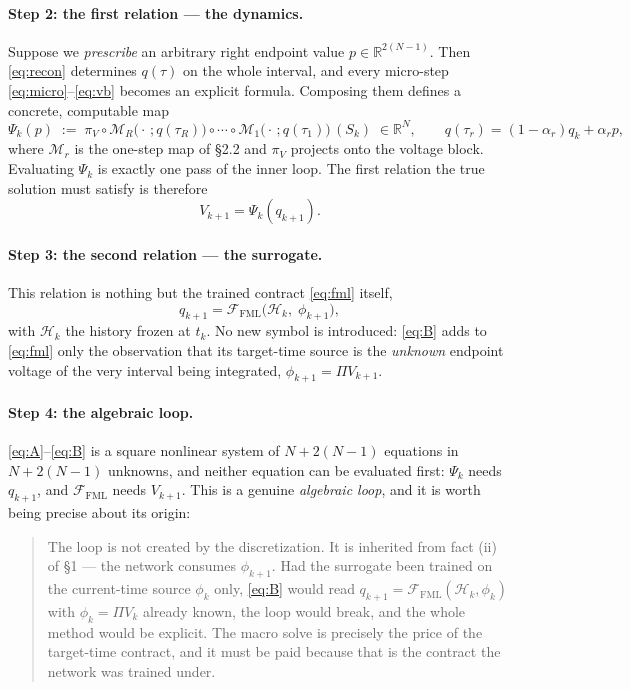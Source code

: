 \documentclass[11pt]{article}
\newcommand{\FML}{\mathcal{F}_{\mathrm{FML}}}
\newcommand{\Rn}{\mathbb{R}}
\begin{document}
\paragraph{Step 2: the first relation --- the dynamics.}
Suppose we \emph{prescribe} an arbitrary right endpoint value
$p\in\Rn^{2(N-1)}$. Then \eqref{eq:recon} determines $q(\tau)$ on the whole
interval, and every micro-step \eqref{eq:micro}--\eqref{eq:vb} becomes an
explicit formula. Composing them defines a concrete, computable map
\begin{equation}
\Psi_k(p)\;:=\;\pi_V\circ\mathcal M_R\bigl(\cdot\,;q(\tau_R)\bigr)\circ\cdots\circ
\mathcal M_1\bigl(\cdot\,;q(\tau_1)\bigr)\,(S_k)\;\in\Rn^N,
\qquad q(\tau_r)=(1-\alpha_r)q_k+\alpha_r p,
\label{eq:psi}
\end{equation}
where $\mathcal M_r$ is the one-step map of \S2.2 and $\pi_V$ projects onto the
voltage block. Evaluating $\Psi_k$ is exactly one pass of the inner loop. The
first relation the true solution must satisfy is therefore
\begin{equation}
V_{k+1}=\Psi_k(q_{k+1}).
\tag{A}
\label{eq:A}
\end{equation}

\paragraph{Step 3: the second relation --- the surrogate.}
This relation is nothing but the trained contract \eqref{eq:fml} itself,
\begin{equation}
q_{k+1}=\FML\bigl(\mathcal H_k,\;\phi_{k+1}\bigr),
\tag{B}
\label{eq:B}
\end{equation}
with $\mathcal H_k$ the history frozen at $t_k$. No new symbol is introduced:
\eqref{eq:B} adds to \eqref{eq:fml} only the observation that its target-time
source is the \emph{unknown} endpoint voltage of the very interval being
integrated, $\phi_{k+1}=\Pi V_{k+1}$.

\paragraph{Step 4: the algebraic loop.}
\eqref{eq:A}--\eqref{eq:B} is a square nonlinear system of $N+2(N-1)$ equations
in $N+2(N-1)$ unknowns, and neither equation can be evaluated first: $\Psi_k$
needs $q_{k+1}$, and $\FML$ needs $V_{k+1}$. This is a genuine \emph{algebraic
loop}, and it is worth being precise about its origin:

\begin{quote}
The loop is not created by the discretization. It is inherited from fact (ii) of
\S1 --- the network consumes $\phi_{k+1}$. Had the surrogate been trained on the
current-time source $\phi_k$ only, \eqref{eq:B} would read
$q_{k+1}=\FML(\mathcal H_k,\phi_k)$ with $\phi_k=\Pi V_k$ already known, the
loop would break, and the whole method
would be explicit. The macro solve is precisely the price of the target-time
contract, and it must be paid because that is the contract the network was
trained under.
\end{quote}
\end{document}
